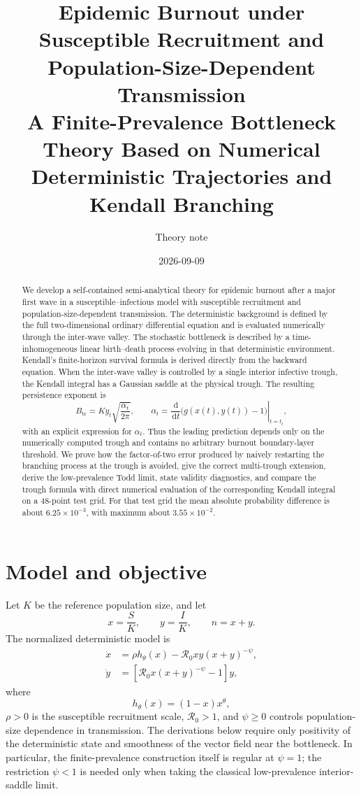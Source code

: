 \documentclass[11pt]{article}
\title{Epidemic Burnout under Susceptible Recruitment and Population-Size-Dependent Transmission\\[0.35em]
\large A Finite-Prevalence Bottleneck Theory Based on Numerical Deterministic Trajectories and Kendall Branching}
\author{Theory note}
\date{2026-09-09}
\newcommand{\Rzero}{\mathcal R_0}
\newcommand{\hth}{h_\theta}
\newcommand{\dd}{\,\mathrm d}
\begin{document}
\maketitle

\begin{abstract}
We develop a self-contained semi-analytical theory for epidemic burnout after a major first wave in a susceptible--infectious model with susceptible recruitment and population-size-dependent transmission. The deterministic background is defined by the full two-dimensional ordinary differential equation and is evaluated numerically through the inter-wave valley. The stochastic bottleneck is described by a time-inhomogeneous linear birth--death process evolving in that deterministic environment. Kendall's finite-horizon survival formula is derived directly from the backward equation. When the inter-wave valley is controlled by a single interior infective trough, the Kendall integral has a Gaussian saddle at the physical trough. The resulting persistence exponent is
\[
B_{\mathrm{tr}}
=K y_t\sqrt{\frac{\alpha_t}{2\pi}},
\qquad
\alpha_t=\left.\frac{\dd}{\dd t}\bigl(g(x(t),y(t))-1\bigr)\right|_{t=t_t},
\]
with an explicit expression for \(\alpha_t\). Thus the leading prediction depends only on the numerically computed trough and contains no arbitrary burnout boundary-layer threshold. We prove how the factor-of-two error produced by naively restarting the branching process at the trough is avoided, give the correct multi-trough extension, derive the low-prevalence Todd limit, state validity diagnostics, and compare the trough formula with direct numerical evaluation of the corresponding Kendall integral on a 48-point test grid. For that test grid the mean absolute probability difference is about \(6.25\times10^{-3}\), with maximum about \(3.55\times10^{-2}\).
\end{abstract}

\tableofcontents
\clearpage

\section{Model and objective}

Let \(K\) be the reference population size, and let
\[
x=\frac{S}{K},\qquad y=\frac{I}{K},\qquad n=x+y.
\]
The normalized deterministic model is
\begin{align}
\dot x&=\rho \hth(x)-\Rzero x y (x+y)^{-\psi},\label{eq:xdot}\\
\dot y&=\left[\Rzero x(x+y)^{-\psi}-1\right]y,\label{eq:ydot}
\end{align}
where
\[
\hth(x)=(1-x)x^\theta,
\]
\(\rho>0\) is the susceptible recruitment scale, \(\Rzero>1\), and \(\psi\ge0\) controls population-size dependence in transmission. The derivations below require only positivity of the deterministic state and smoothness of the vector field near the bottleneck. In particular, the finite-prevalence construction itself is regular at \(\psi=1\); the restriction \(\psi<1\) is needed only when taking the classical low-prevalence interior-saddle limit.
\end{document}
